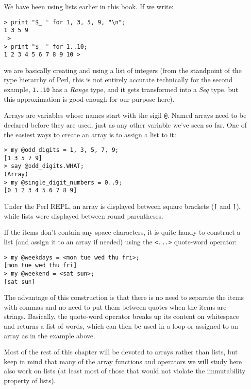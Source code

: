 We have been using lists earlier in this book. If we write:

\begin{verbatim}
> print "$_ " for 1, 3, 5, 9, "\n";
1 3 5 9
 >
> print "$_ " for 1..10;
1 2 3 4 5 6 7 8 9 10 >
\end{verbatim}

we are basically creating and using a list of integers (from 
the standpoint of the type hierarchy of Perl, this is 
not entirely accurate technically for the second example, 
\verb'1..10' has a \emph{Range} type, and it gets 
transformed into a \emph{Seq} type, but this approximation is 
good enough for our purpose here).

Arrays are variables whose names start with the sigil \verb'@'.
Named arrays  need to be declared before they are used, just 
as any other variable we've seen so far. One of the easiest 
ways to create an array is to assign a list to it:

\begin{verbatim}
> my @odd_digits = 1, 3, 5, 7, 9;
[1 3 5 7 9]
> say @odd_digits.WHAT;
(Array)
> my @single_digit_numbers = 0..9;
[0 1 2 3 4 5 6 7 8 9]
\end{verbatim}

Under the Perl REPL, an array is displayed between square 
brackets (\verb"[" and \verb"]"), while lists were displayed 
between round parentheses.

If the items don't contain any space characters, it is quite handy 
to construct a list (and assign it to an array if needed) using 
the \verb'<...>' quote-word operator:

\begin{verbatim}
> my @weekdays = <mon tue wed thu fri>;
[mon tue wed thu fri]
> my @weekend = <sat sun>;
[sat sun]
\end{verbatim}

The advantage of this construction is that there is no need to 
separate the items with commas and no need to put them between 
quotes when the items are strings. Basically, 
the quote-word operator breaks up its content on whitespace 
and returns a list of words, which can then be 
used in a loop or assigned to an array as in the example 
above.

Most of the rest of this chapter will be devoted to arrays 
rather than lists, but keep in mind that many of the array 
functions and operators we will study here also work on lists 
(at least most of those that would not violate the 
immutability property of lists).
 
